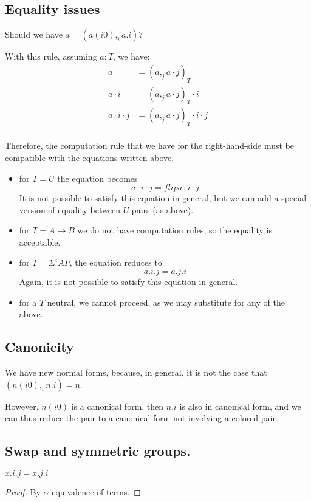 \documentclass[10pt,a4paper]{article}
\newcommand\CC[4]{(#2,_{#1} #3)_{#4}}
\newcommand\CSig[1]{\Sigma^{#1}}
\newcommand\param[1]{\!\cdot\!#1}
\begin{document}
\subsection{Equality issues}

Should we have $a = (a(i0),_i a.i)$?

With this rule, assuming $a:T$, we have:
\begin{align*}
  a &= \CC j a {a \param j} T \\
  a \param i &= \CC j a {a \param j} T \param i \\
  a \param i \param j &= \CC j a {a \param j} T \param i \param j\\
\end{align*}

Therefore, the computation rule that we have for the right-hand-side must be
compatible with the equations written above.

\begin{itemize}
\item 
for $T = U$ the equation becomes
$$a \param i \param j = flip a \param i \param j$$
It is not possible to satisfy this equation in general, but we can add a special version of equality between $U$ pairs (as above).
\item
for $T = A → B$ we do not have computation rules; so the equality is acceptable.
\item
for $T = \CSig i A P$, the equation reduces to
\[
a.i.j = a.j.i
\]
Again, it is not possible to satisfy this equation in general.
\item
for a $T$ neutral, we cannot proceed, as we may substitute for any of the above.
\end{itemize}


\subsection{Canonicity}

We have new normal forms, because, in general, it is not the case that $(n(i0),_i n.i) = n$.

However, $n(i0)$ is a canonical form, then $n.i$ is also in canonical form, and we can thus
reduce the pair to a canonical form not involving a colored pair.


\subsection{Swap and symmetric groups.}

\begin{lemma}\label{lem:param-var}
  $x.i.j = x.j.i$
\end{lemma}
\begin{proof}
  By $α$-equivalence of terms.
\end{proof}
\end{document}
